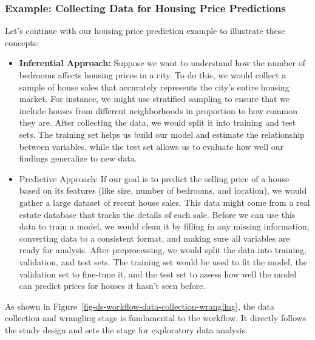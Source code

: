 \documentclass[
  letterpaper,
  DIV=11,
  numbers=noendperiod]{scrreprt}
\begin{document}
\subsubsection{Example: Collecting Data for Housing Price
Predictions}\label{example-collecting-data-for-housing-price-predictions}

Let's continue with our housing price prediction example to illustrate
these concepts:

\begin{itemize}
\item
  \textbf{Inferential Approach:} Suppose we want to understand how the
  number of bedrooms affects housing prices in a city. To do this, we
  would collect a sample of house sales that accurately represents the
  city's entire housing market. For instance, we might use stratified
  sampling to ensure that we include houses from different neighborhoods
  in proportion to how common they are. After collecting the data, we
  would split it into training and test sets. The training set helps us
  build our model and estimate the relationship between variables, while
  the test set allows us to evaluate how well our findings generalize to
  new data.
\item
  Predictive Approach: If our goal is to predict the selling price of a
  house based on its features (like size, number of bedrooms, and
  location), we would gather a large dataset of recent house sales. This
  data might come from a real estate database that tracks the details of
  each sale. Before we can use this data to train a model, we would
  clean it by filling in any missing information, converting data to a
  consistent format, and making sure all variables are ready for
  analysis. After preprocessing, we would split the data into training,
  validation, and test sets. The training set would be used to fit the
  model, the validation set to fine-tune it, and the test set to assess
  how well the model can predict prices for houses it hasn't seen
  before.
\end{itemize}

As shown in Figure~\ref{fig-ds-workflow-data-collection-wrangling}, the
data collection and wrangling stage is fundamental to the workflow. It
directly follows the study design and sets the stage for exploratory
data analysis.
\end{document}
